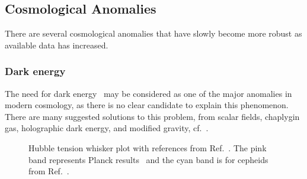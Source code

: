 \documentclass[10pt]{article}
\begin{document}
\subsection{Cosmological Anomalies}
\label{sec:cosmology}
%
There are several cosmological anomalies that have slowly become more robust as available data has increased. 


\subsubsection{Dark energy}
%
The need for dark energy~\cite{SupernovaSearchTeam:1998fmf,SupernovaCosmologyProject:1998vns} may be considered as one of the major anomalies in modern cosmology, as there is no clear candidate to explain this phenomenon. There are many suggested solutions to this problem, from scalar fields, chaplygin gas, holographic dark energy, and modified gravity, cf.~\cite{Li:2012dt}.  

\begin{figure}[htbp]
	\centering
	\caption{Hubble tension whisker plot with references from Ref.~\cite{DiValentino:2021izs}. The pink band represents Planck results~\cite{Planck:2018vyg} and the cyan band is for cepheids from Ref.~\cite{Riess:2020fzl}.}
	\label{fig:hubble}
\end{figure}
\end{document}
